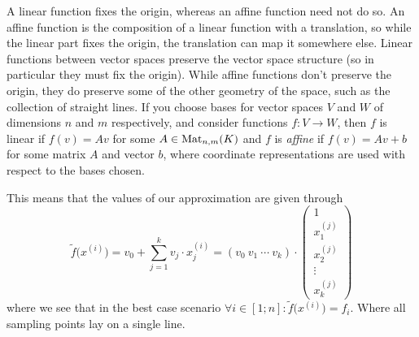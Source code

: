 A linear function fixes the origin, whereas an affine function need not do so.
An affine function is the composition of a linear function with a translation, so while the linear part fixes the origin, the translation can map it somewhere else.
Linear functions between vector spaces preserve the vector space structure (so in particular they must fix the origin).
While affine functions don't preserve the origin, they do preserve some of the other geometry of the space, such as the collection of straight lines.
If you choose bases for vector spaces \(V\) and \(W\) of dimensions \(n\) and \(m\) respectively, and consider functions \(f: V \to W\), then \(f\) is linear if \(f(v) = Av\) for some \(A \in \operatorname{Mat}_{n,m}(K)\) and \(f\) is \emph{affine} if \(f(v) = Av + b\) for some matrix \(A\) and vector \(b\), where coordinate representations are used with respect to the bases chosen.

This means that the values of our approximation are given through
\[\widetilde{f}\Big(x^{(i)}\Big) = v_0 + \sum_{j=1}^k v_j \cdot x_j^{(i)} = (v_0~v_1~\cdots~v_k) \cdot \begin{pmatrix}1\\x_1^{(j)}\\x_2^{(j)}\\ \vdots \\ x_k^{(j)}\end{pmatrix}\]
where we see that in the best case scenario \(\forall i \in [1; n]: \widetilde{f}\big(x^{(i)}\big) = f_i\).
Where all sampling points lay on a single line.

